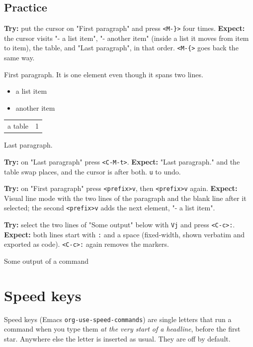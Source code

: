 \subsection{Practice}
\label{sec:org80a4529}
\textbf{Try:} put the cursor on "First paragraph" and press \texttt{<M-\}>} four times.
\textbf{Expect:} the cursor visits "- a list item", "- another item" (inside a
list it moves from item to item), the table, and "Last paragraph", in
that order. \texttt{<M-\{>} goes back the same way.

First paragraph. It is one element even though
it spans two lines.

\begin{itemize}
\item a list item
\item another item
\end{itemize}

\begin{center}
\begin{tabular}{lr}
a table & 1\\
\end{tabular}
\end{center}

Last paragraph.

\textbf{Try:} on "Last paragraph" press \texttt{<C-M-t>}.
\textbf{Expect:} "Last paragraph." and the table swap places, and the cursor is
after both. \texttt{u} to undo.

\textbf{Try:} on "First paragraph" press \texttt{<prefix>v}, then \texttt{<prefix>v} again.
\textbf{Expect:} Visual line mode with the two lines of the paragraph and the
blank line after it selected; the second \texttt{<prefix>v} adds the next
element, "- a list item".

\textbf{Try:} select the two lines of "Some output" below with \texttt{Vj} and press
\texttt{<C-c>:}.
\textbf{Expect:} both lines start with \texttt{:} and a space (fixed-width, shown verbatim and
exported as code). \texttt{<C-c>:} again removes the markers.

Some output
of a command
\section{Speed keys}
\label{sec:org1fec826}
Speed keys (Emacs \texttt{org-use-speed-commands}) are single letters that run a
command when you type them \emph{at the very start of a headline}, before the
first star. Anywhere else the letter is inserted as usual. They are off by
default.

